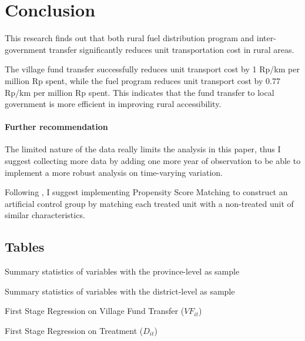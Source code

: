 \documentclass[letterpaper,12pt,leqno]{article}
\newcommand{\bib}{bibliography.bib}
\begin{document}
\section{Conclusion}\label{s:conclusion}

This research finds out that both rural fuel distribution program and inter-government transfer significantly reduces unit transportation cost in rural areas. 

The village fund transfer successfully reduces unit transport cost by 1 Rp/km per million Rp spent, while the fuel program reduces unit transport cost by 0.77 Rp/km per million Rp spent. This indicates that the fund transfer to local government is more efficient in improving rural accessibility.

\paragraph{Further recommendation}
The limited nature of the data really limits the analysis in this paper, thus I suggest collecting more data by adding one more year of observation to be able to implement a more robust analysis on time-varying variation.

Following \citet{abadie2016}, I suggest implementing Propensity Score Matching to construct an artificial control group by matching each treated unit with a non-treated unit of similar characteristics.



\newpage
\appendix
\begin{landscape}
\section{Tables}\label{a:table}

\begin{table}[H]
\caption{Summary statistics of variables with the province-level as sample} 
\scalebox{0.85}{}
\label{t:1}\end{table}


\begin{table}[H]
\caption{Summary statistics of variables with the district-level as sample} 
\scalebox{0.85}{}
\label{t:2}\end{table}


\begin{table}[H]
\caption{First Stage Regression on Village Fund Transfer ($VF_{it}$)}
\scalebox{0.8}{}    
\label{t:FSVF}\end{table}


\begin{table}[H]
\caption{First Stage Regression on Treatment ($D_{it}$)}
\scalebox{0.8}{}    
\label{t:FSD}\end{table}
\end{landscape}
\end{document}
